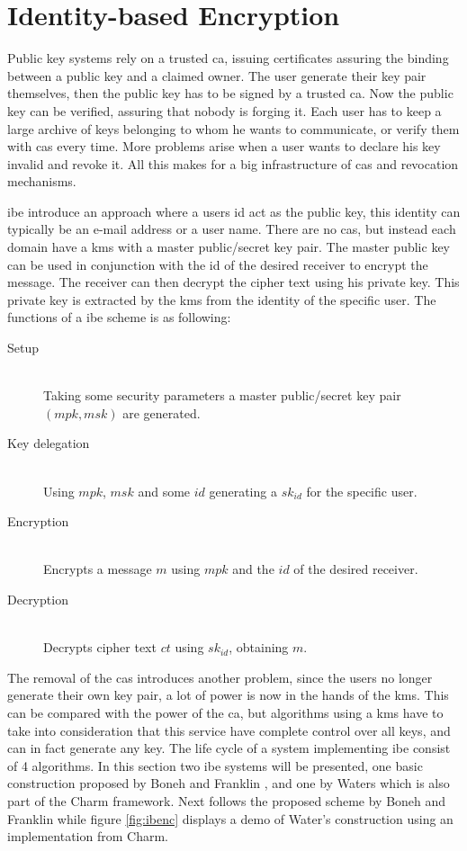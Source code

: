 \section{Identity-based Encryption}\label{subsec:IBE}
Public key systems rely on a trusted \gls{ca}, issuing certificates assuring the binding between a public key and a claimed owner. The user generate their key pair themselves, then the public key has to be signed by a trusted \glsdesc{ca}. Now the public key can be verified, assuring that nobody is forging it. Each user has to keep a large archive of keys belonging to whom he wants to communicate, or verify them with \glspl{ca} every time. More problems arise when a user wants to declare his key invalid and revoke it. All this makes for a big infrastructure of \glspl{ca} and revocation mechanisms. 
\par \Gls{ibe} \cite{DBLP:ibe} introduce an approach where a users id act as the public key, this identity can typically be an e-mail address or a user name. There are no \glspl{ca}, but instead each domain have a \gls{kms} with a master public/secret key pair. The master public key can be used in conjunction with the id of the desired receiver to encrypt the message. The receiver can then decrypt the cipher text using his private key. This private key is extracted by the \gls{kms} from the identity of the specific user. 
The functions of a \gls{ibe} scheme is as following:
\begin{description}
\item[Setup]\hfill \\ Taking some security parameters a master public/secret key pair $(mpk, msk)$ are generated.
\item[Key delegation]\hfill \\Using $mpk$, $msk$ and some $id$ generating a $sk_{id}$ for the specific user. 
\item[Encryption]\hfill \\ Encrypts a message $m$ using $mpk$ and the $id$ of the desired receiver. 
\item[Decryption] \hfill \\Decrypts cipher text $ct$ using $sk_{id}$, obtaining $m$. 
\end{description}
The removal of the \glspl{ca} introduces another problem, since the users no longer generate their own key pair, a lot of power is now in the hands of the \gls{kms}. This can be compared with the power of the \gls{ca}, but algorithms using a \gls{kms} have to take into consideration that this service have complete control over all keys, and can in fact generate any key. The life cycle of a system implementing \gls{ibe} consist of 4 algorithms. In this section two \gls{ibe} systems will be presented, one basic construction proposed by Boneh and Franklin \cite{DBLP:ibe}, and one by Waters \cite{ibe_waters09} which is also part of the Charm framework. Next follows the proposed scheme by Boneh and Franklin while figure \ref{fig:ibenc} displays a demo of Water's \cite{ibe_waters09} construction using an implementation from Charm.


